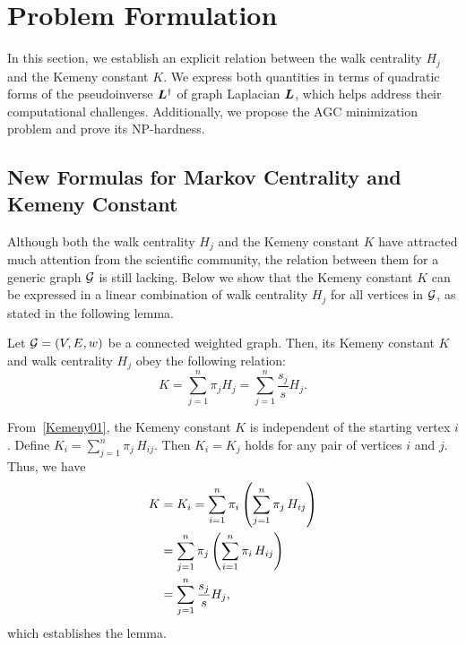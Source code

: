 \documentclass[journal]{IEEEtran}
\begin{document}

\section{Problem Formulation}

In this section, we establish an explicit relation between the walk centrality \(H_j\) and the Kemeny constant \(K\).
We express both quantities in terms of quadratic forms of the pseudoinverse \(\boldsymbol{L}^{\dagger}\) of graph Laplacian \(\boldsymbol{L}\), which helps address their computational challenges.
Additionally, we propose the AGC minimization problem and prove its NP-hardness.

\subsection{New Formulas for Markov Centrality and Kemeny Constant}

Although both the walk centrality \(H_j\) and the Kemeny constant \(K\) have attracted much attention from the scientific community, the relation between  them for a generic  graph  \(\mathcal{G}\) is still lacking. Below we show that the Kemeny constant \(K\) can be expressed in a linear combination of walk centrality  \(H_j\) for all vertices in \(\mathcal{G}\), as stated in the following lemma.

\begin{lemma}
    Let \(\mathcal{G}=(V,E,w)\) be a connected weighted graph. Then, its  Kemeny constant \(K\)  and walk centrality \(H_j\) obey the following relation:
    \begin{equation}\label{HjK01}
        K=\sum_{j=1}^{n} \pi_j H_j=\sum_{j=1}^{n} \frac{s_j}{s} H_j.
    \end{equation}
\end{lemma}
\begin{IEEEproof}
    From~\eqref{Kemeny01}, the Kemeny constant \(K\) is independent of the starting vertex \(i\). Define \(K_i =\sum_{j=1}^{n}\pi_j\,H_{ij}\). Then   \(K_i=K_j\) holds for any pair of vertices \(i\) and \(j\). Thus, we have
    \begin{align}\label{Kemeny02}
        K & =K_i =\sum_{i=1}^{n} \pi_i \left( \sum_{j=1}^{n}\pi_j\,H_{ij}\right) \notag \\
          & =\sum_{j=1}^{n} \pi_j \left( \sum_{i=1}^{n}\pi_i\,H_{ij}\right) \notag      \\
          & =\sum_{j=1}^{n} \frac{s_j}{s} H_j,\notag
    \end{align}
    which establishes the lemma.
\end{IEEEproof}
\end{document}
